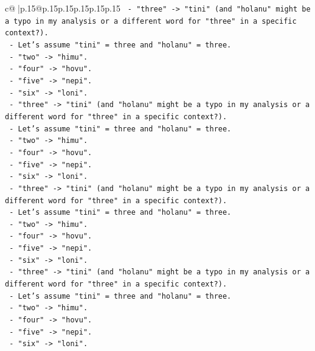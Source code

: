 \documentclass{article}
\begin{document}
{\begin{supertabular}{c@{$\;$}|p{.15\linewidth}@{}p{.15\linewidth}p{.15\linewidth}p{.15\linewidth}p{.15\linewidth}p{.15\linewidth}}
{{{\texttt{            {-} "three" {-}> "tini" (and "holanu" might be a typo in my analysis or a different word for "three" in a specific context?).} \\
\texttt{            {-} Let's assume "tini" = three and "holanu" = three.} \\
\texttt{            {-} "two" {-}> "himu".} \\
\texttt{            {-} "four" {-}> "hovu".} \\
\texttt{            {-} "five" {-}> "nepi".} \\
\texttt{            {-} "six" {-}> "loni".} \\
\texttt{            {-} "three" {-}> "tini" (and "holanu" might be a typo in my analysis or a different word for "three" in a specific context?).} \\
\texttt{            {-} Let's assume "tini" = three and "holanu" = three.} \\
\texttt{            {-} "two" {-}> "himu".} \\
\texttt{            {-} "four" {-}> "hovu".} \\
\texttt{            {-} "five" {-}> "nepi".} \\
\texttt{            {-} "six" {-}> "loni".} \\
\texttt{            {-} "three" {-}> "tini" (and "holanu" might be a typo in my analysis or a different word for "three" in a specific context?).} \\
\texttt{            {-} Let's assume "tini" = three and "holanu" = three.} \\
\texttt{            {-} "two" {-}> "himu".} \\
\texttt{            {-} "four" {-}> "hovu".} \\
\texttt{            {-} "five" {-}> "nepi".} \\
\texttt{            {-} "six" {-}> "loni".} \\
\texttt{            {-} "three" {-}> "tini" (and "holanu" might be a typo in my analysis or a different word for "three" in a specific context?).} \\
\texttt{            {-} Let's assume "tini" = three and "holanu" = three.} \\
\texttt{            {-} "two" {-}> "himu".} \\
\texttt{            {-} "four" {-}> "hovu".} \\
\texttt{            {-} "five" {-}> "nepi".} \\
\texttt{            {-} "six" {-}> "loni".} \\
}}}
\end{supertabular}}
\end{document}
